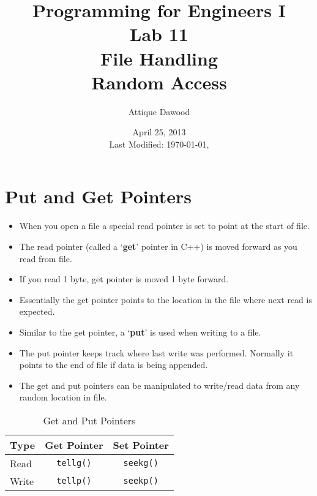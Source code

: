 \documentclass[12pt,a4paper]{article}
\title{Programming for Engineers I\\Lab 11\\File Handling\\Random Access}
\author{Attique Dawood}
\date{April 25, 2013\\[0.2cm] Last Modified: \today, \currenttime}
\begin{document}
\maketitle
\section{Put and Get Pointers}
\begin{itemize}
\item When you open a file a special read pointer is set to point at the start of file.
\item The read pointer (called a `\textbf{get}' pointer in C++) is moved forward as you read from file.
\item If you read 1 byte, get pointer is moved 1 byte forward.
\item Essentially the get pointer points to the location in the file where next read is expected.
\item Similar to the get pointer, a `\textbf{put}' is used when writing to a file.
\item The put pointer keeps track where last write was performed. Normally it points to the end of file if data is being appended.
\item The get and put pointers can be manipulated to write/read data from any random location in file.
\end{itemize}
\begin{table}[H]
\begin{center}
\vspace{0.3cm}
	\begin{tabular}{lcc}
	\hline \hline
		\textbf{Type} \rule{0pt}{2.6ex} & \textbf{Get Pointer} & \textbf{Set Pointer}\\
		\hline
		Read \rule{0pt}{2.6ex} &  \verb|tellg()| & \verb|seekg()|\\
		Write \rule{0pt}{2.6ex} & \verb|tellp()| & \verb|seekp()|\\
	\hline \hline
	\end{tabular}
\end{center}
\label{GetandPutPointers}
\caption{Get and Put Pointers}
\end{table}
\end{document}

